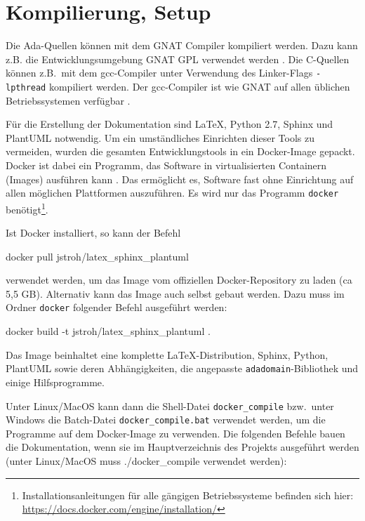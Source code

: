 \documentclass[oneside]{elaboration}
\begin{document}
\section{Kompilierung, Setup}
\label{sec:kompilierung_setup}

Die Ada-Quellen können mit dem GNAT Compiler kompiliert werden. Dazu kann z.B.
die Entwicklungsumgebung GNAT GPL verwendet werden \citep[vgl.][]{GNAT}. Die
C-Quellen können z.B.\ mit dem gcc-Compiler unter Verwendung des Linker-Flags
\texttt{-lpthread} kompiliert werden. Der gcc-Compiler ist wie GNAT auf allen
üblichen Betriebssystemen verfügbar \citep[vgl.][]{GCC}.

Für die Erstellung der Dokumentation sind LaTeX, Python 2.7, Sphinx und PlantUML
notwendig. Um ein umständliches Einrichten dieser Tools zu vermeiden, wurden die
gesamten Entwicklungstools in ein Docker-Image gepackt. Docker ist dabei ein
Programm, das Software in virtualisierten Containern (Images) ausführen kann
\citep[vgl.][]{Docker}. Das ermöglicht es, Software fast ohne Einrichtung auf
allen möglichen Plattformen auszuführen. Es wird nur das Programm
\texttt{docker} benötigt\footnote{Installationsanleitungen für alle gängigen
Betriebssysteme befinden sich hier:
\url{https://docs.docker.com/engine/installation/}}.

Ist Docker installiert, so kann der Befehl

\begin{bashcode}
    docker pull jstroh/latex_sphinx_plantuml
\end{bashcode}

verwendet werden, um das Image vom offiziellen Docker-Repository zu laden (ca
5,5 GB). Alternativ kann das Image auch selbst gebaut werden. Dazu muss im
Ordner \texttt{docker} folgender Befehl ausgeführt werden:

\begin{bashcode}
    docker build -t jstroh/latex_sphinx_plantuml .
\end{bashcode}

Das Image beinhaltet eine komplette LaTeX-Distribution, Sphinx, Python, PlantUML
sowie deren Abhängigkeiten, die angepasste \texttt{adadomain}-Bibliothek und
einige Hilfsprogramme. 

Unter Linux/MacOS kann dann die Shell-Datei \texttt{docker\_compile} bzw.\ unter
Windows die Batch-Datei \texttt{docker_compile.bat} verwendet werden, um die
Programme auf dem Docker-Image zu verwenden. Die folgenden Befehle bauen die
Dokumentation, wenn sie im Hauptverzeichnis des Projekts ausgeführt werden
(unter Linux/MacOS muss ./docker\_compile verwendet werden):
\end{document}
